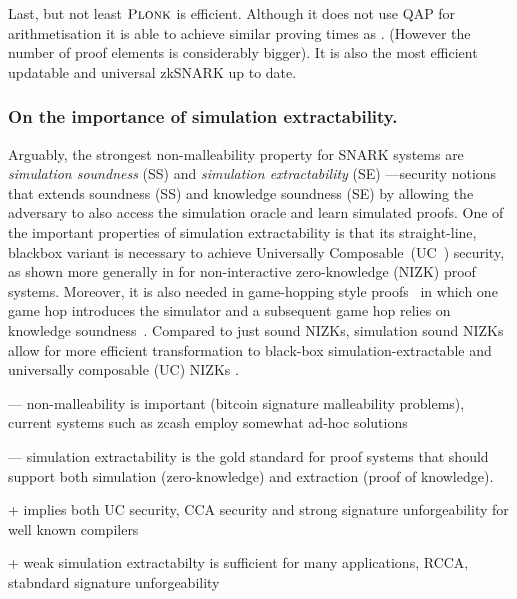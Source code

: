 \documentclass[runningheads,11pt]{llncs}
\begin{document}
	Last, but not least $\textsc{Plonk}$ is efficient. Although it does not use QAP for arithmetisation it is able to achieve similar proving times as \groth{}. (However the number of proof elements is considerably bigger). 
	It is also the most efficient updatable and universal zkSNARK up to date.
	
	\subsubsection*{On the importance of simulation extractability.}
	Arguably, the strongest non-malleability property for SNARK systems are \emph{simulation soundness} (SS) and \emph{simulation extractability} (SE) \cite{FOCS:Sahai99,C:DDOPS01}---security notions that extends soundness (SS) and knowledge soundness (SE) by allowing the adversary to also access the simulation oracle and learn simulated proofs. 
	One of the important properties of simulation extractability is that its
	straight-line, blackbox variant is necessary to achieve Universally Composable~(UC~\cite{FOCS:Canetti01}) security, as shown more generally in 	\cite{STOC:CLOS02,AC:Groth06,EC:GroOstSah06} for non-interactive zero-knowledge (NIZK) proof systems. Moreover, it is also needed in game-hopping style proofs~\cite{EPRINT:Shoup04} in which one game hop
	introduces the simulator and a subsequent game hop relies on knowledge
	soundness~\cite{SP:KMSWP16,CCS:CamDriDub17}.
	Compared to just sound NIZKs, simulation sound NIZKs allow for more efficient transformation to black-box simulation-extractable and universally composable (UC) NIZKs \cite{AFRICACRYPT:Baghery19}. 

  --- non-malleability is important (bitcoin signature malleability problems), current
  systems such as zcash employ somewhat ad-hoc solutions

  --- simulation extractability is the gold standard for proof systems that
  should support both simulation (zero-knowledge) and extraction (proof of
  knowledge).

  + implies both UC security, CCA security and strong signature unforgeability
  for well known compilers

  + weak simulation extractabilty is sufficient for many applications, RCCA,
  stabndard signature unforgeability
	
		
\end{document}
